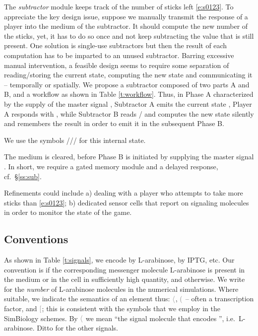 \documentclass[12pt,notitlepage]{article}
\newcommand{\cbra}[1]{{\ensuremath{\color{gray}{#1}}}}
\newcommand{\signal}[1]{{{\cbra{\langle}\ce{#1}\cbra{\rangle}}}}
\newcommand{\protein}[1]{{{\cbra{(}\ce{#1}\cbra{)}}}}
\newcommand{\promoter}[1]{{{\cbra{[}\ce{#1}\cbra{]}}}}
\begin{document}
The \emph{subtractor} module
keeps track of the number of sticks left \eqref{e:s0123}.
To appreciate the key design issue, suppose
we manually transmit the response 
of a player
into the medium of the subtractor.
It should compute the new number of the sticks,
yet, it has to do so once
and not keep subtracting the value 
that is still present.
One solution is single-use subtractors
but then the result of each computation
has to be imparted to an unused subtractor.
Barring excessive manual intervention,
a feasible design
seems to require some separation of
reading/storing the current state,
computing the new state and communicating it
--
temporally or spatially.
%
%
%
We propose 
a subtractor composed of two parts A and B,
and
a workflow 
as shown in Table \ref{t:workflow}.
%
%
%
Thus,
in Phase A characterized by the supply of 
the master signal ,
Subtractor A
emits the current state ,
Player A responds with ,
while
Subtractor B
reads /
and
computes the new state %
{silently}
and remembers the result
in order to emit it in the subsequent Phase B.
%

We use the symbols ///
for this internal state.

%
The medium is cleared, before
Phase B is initiated by
supplying the master signal .
%
%
In short,
we require
a gated memory module and a delayed response,
cf.~\S\ref{ss:sub}.
%
%

%

Refinements could include
a)
dealing with
a player who attempts to take more sticks than \eqref{e:s0123};
b)
dedicated sensor cells 
that report on signaling molecules 
in order to 
monitor the state of the game.

%





\subsection{Conventions}



%
As shown in Table \ref{t:signals},
we encode  by L-arabinose,
 by IPTG, etc.
%
Our convention is 
if 
the corresponding messenger molecule L-arabinose 
is present in the medium or in the cell 
in sufficiently high quantity,
and  otherwise.
%
We write  for
the \emph{number} of L-arabinose molecules 
in the numerical simulations.
%
Where suitable,
we indicate the semantics of an element thus:
\signal{signal},
\protein{protein} -- often a transcription factor,
and
\promoter{promoter};
%
this is consistent with 
the symbols that we employ in
the SimBiology schemes.
%
By \signal{w_A} we mean 
``the signal molecule that encodes '',
i.e.~L-arabinose.
%
Ditto for the other signals.
\end{document}
